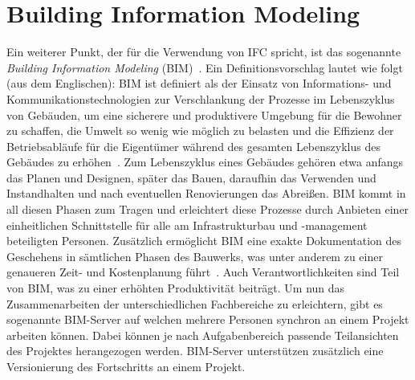 \section{Building Information Modeling}\label{basics:bim}
Ein weiterer Punkt, der für die Verwendung von IFC spricht, ist das sogenannte \textit{Building Information Modeling} (BIM)~\cite{Building41:online}.
Ein Definitionsvorschlag lautet wie folgt (aus dem Englischen): \glqq{}BIM ist definiert als der Einsatz von Informations- und Kommunikationstechnologien zur Verschlankung der Prozesse im Lebenszyklus von Gebäuden, um eine sicherere und produktivere Umgebung für die Bewohner zu schaffen, die Umwelt so wenig wie möglich zu belasten und die Effizienz der Betriebsabläufe für die Eigentümer während des gesamten Lebenszyklus des Gebäudes zu erhöhen\grqq{}~\cite{Arayici2010}.
Zum Lebenszyklus eines Gebäudes gehören etwa anfangs das Planen und Designen, später das Bauen, daraufhin das Verwenden und Instandhalten und nach eventuellen Renovierungen das Abreißen.
BIM kommt in all diesen Phasen zum Tragen und erleichtert diese Prozesse durch Anbieten einer einheitlichen Schnittstelle für alle am Infrastrukturbau und -management beteiligten Personen.
Zusätzlich ermöglicht BIM eine exakte Dokumentation des Geschehens in sämtlichen Phasen des Bauwerks, was unter anderem zu einer genaueren Zeit- und Kostenplanung führt~\cite{Ding2014}.
Auch Verantwortlichkeiten sind Teil von BIM, was zu einer erhöhten Produktivität beiträgt.
Um nun das Zusammenarbeiten der unterschiedlichen Fachbereiche zu erleichtern, gibt es sogenannte BIM-Server auf welchen mehrere Personen synchron an einem Projekt arbeiten können.
Dabei können je nach Aufgabenbereich passende Teilansichten des Projektes herangezogen werden.
BIM-Server unterstützen zusätzlich eine Versionierung des Fortschritts an einem Projekt.


